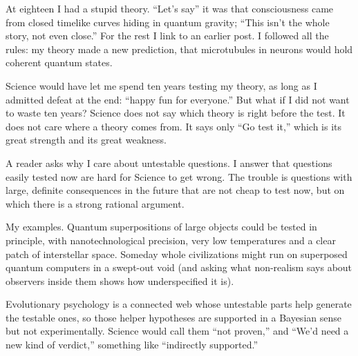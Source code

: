 
At eighteen I had a stupid theory. ``Let's say'' it was that consciousness came from closed timelike curves hiding in quantum gravity; ``This isn't the whole story, not even close.'' For the rest I link to an earlier post. I followed all the rules: my theory made a new prediction, that microtubules in neurons would hold coherent quantum states. 

Science would have let me spend ten years testing my theory, as long as I admitted defeat at the end: ``happy fun for everyone.'' But what if I did not want to waste ten years? Science does not say which theory is right before the test. It does not care where a theory comes from. It says only ``Go test it,'' which is its great strength and its great weakness. 

A reader asks why I care about untestable questions. I answer that questions easily tested now are hard for Science to get wrong. The trouble is questions with large, definite consequences in the future that are not cheap to test now, but on which there is a strong rational argument.

My examples. Quantum superpositions of large objects could be tested in principle, with nanotechnological precision, very low temperatures and a clear patch of interstellar space. Someday whole civilizations might run on superposed quantum computers in a swept-out void (and asking what non-realism says about observers inside them shows how underspecified it is).

Evolutionary psychology is a connected web whose untestable parts help generate the testable ones, so those helper hypotheses are supported in a Bayesian sense but not experimentally. Science would call them ``not proven,'' and ``We'd need a new kind of verdict,'' something like ``indirectly supported.'' 

